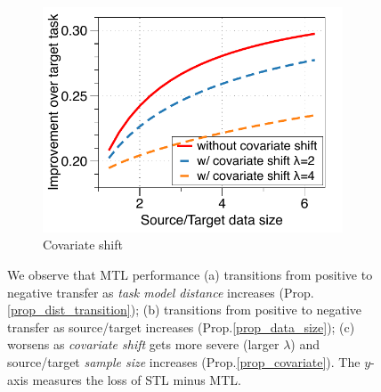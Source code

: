 \begin{figure}[!t]
\begin{subfigure}[b]{0.32\textwidth}
		\centering
		\includegraphics[width=0.98\textwidth]{figures/complementary.pdf}
		\vspace{-0.075in}
		\caption{Covariate shift}
		\label{fig_covariate}
	\end{subfigure}
	\caption{%
	We observe that MTL performance
	(a) transitions from positive to negative transfer as \textit{task model distance} increases (Prop.\;\ref{prop_dist_transition});
	(b) transitions from positive to negative transfer as source/target  increases (Prop.\;\ref{prop_data_size});
	(c) worsens as \textit{covariate shift} gets more severe (larger $\lambda$) and source/target \textit{sample size} increases (Prop.\;\ref{prop_covariate}).
	The $y$-axis measures the loss of STL minus MTL.}
	\label{fig_model_shift_phasetrans}
	\vspace{-0.3in}
\end{figure}




